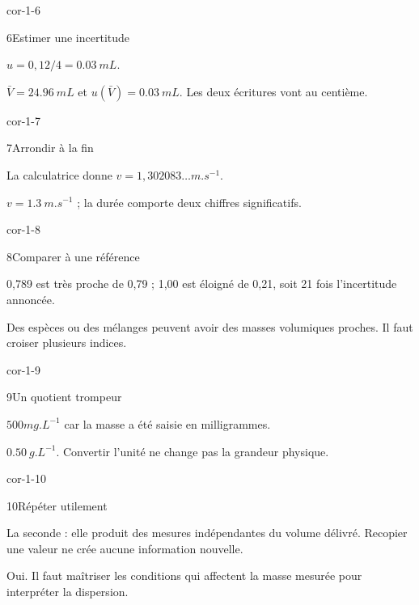\begin{blocLivre}{cor-1-6}\begin{corrige}{6}{Estimer une incertitude}
\begin{questions}
\item $u=0,12/4=\qty{0,03}{mL}$.
\item $\bar V=\qty{24,96}{mL}$ et $u(\bar V)=\qty{0,03}{mL}$. Les deux écritures vont au centième.
\end{questions}
\end{corrige}\end{blocLivre}
\begin{blocLivre}{cor-1-7}\begin{corrige}{7}{Arrondir à la fin}
\begin{questions}
\item La calculatrice donne $v=1,302083\ldots\unit{m.s^{-1}}$.
\item $v=\qty{1,3}{m.s^{-1}}$ ; la durée comporte deux chiffres significatifs.
\end{questions}
\end{corrige}\end{blocLivre}
\begin{blocLivre}{cor-1-8}\begin{corrige}{8}{Comparer à une référence}
\begin{questions}
\item 0,789 est très proche de 0,79 ; 1,00 est éloigné de 0,21, soit 21 fois l’incertitude annoncée.
\item Des espèces ou des mélanges peuvent avoir des masses volumiques proches. Il faut croiser plusieurs indices.
\end{questions}
\end{corrige}\end{blocLivre}
\begin{blocLivre}{cor-1-9}\begin{corrige}{9}{Un quotient trompeur}
\begin{questions}
\item $500\unit{mg.L^{-1}}$ car la masse a été saisie en milligrammes.
\item $\qty{0,50}{g.L^{-1}}$. Convertir l’unité ne change pas la grandeur physique.
\end{questions}
\end{corrige}\end{blocLivre}
\begin{blocLivre}{cor-1-10}\begin{corrige}{10}{Répéter utilement}
\begin{questions}
\item La seconde : elle produit des mesures indépendantes du volume délivré. Recopier une valeur ne crée aucune information nouvelle.
\item Oui. Il faut maîtriser les conditions qui affectent la masse mesurée pour interpréter la dispersion.
\end{questions}
\end{corrige}\end{blocLivre}
